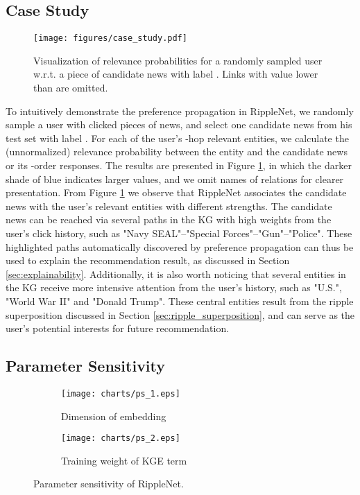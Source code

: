 \documentclass[sigconf]{acmart}
\begin{document}
		
	\subsection{Case Study}
		\begin{figure}[t]
			\centering
  			\texttt{[image: figures/case\_study.pdf]}
  			\caption{Visualization of relevance probabilities for a randomly sampled user w.r.t. a piece of candidate news with label . Links with value lower than  are omitted.}
  			\label{fig:cs}
		\end{figure}
		
		To intuitively demonstrate the preference propagation in RippleNet, we randomly sample a user with  clicked pieces of news, and select one candidate news from his test set with label .
		For each of the user's -hop relevant entities, we calculate the (unnormalized) relevance probability between the entity and the candidate news or its -order responses.
		The results are presented in Figure \ref{fig:cs}, in which the darker shade of blue indicates larger values, and we omit names of relations for clearer presentation.
		From Figure \ref{fig:cs} we observe that RippleNet associates the candidate news with the user's relevant entities with different strengths.
		The candidate news can be reached via several paths in the KG with high weights from the user's click history, such as "Navy SEAL"--"Special Forces"--"Gun"--"Police".
		These highlighted paths automatically discovered by preference propagation can thus be used to explain the recommendation result, as discussed in Section \ref{sec:explainability}.
		Additionally, it is also worth noticing that several entities in the KG receive more intensive attention from the user's history, such as "U.S.", "World War II" and "Donald Trump".
		These central entities result from the ripple superposition discussed in Section \ref{sec:ripple_superposition}, and can serve as the user's potential interests for future recommendation.

		
	\subsection{Parameter Sensitivity}
		\begin{figure}[t]
			\centering
            \begin{subfigure}[b]{0.23\textwidth}
                \texttt{[image: charts/ps\_1.eps]}
                \caption{Dimension of embedding}
                \label{fig:ps_1}
            \end{subfigure}
            \hfill
            \begin{subfigure}[b]{0.23\textwidth}
                \texttt{[image: charts/ps\_2.eps]}
                \caption{Training weight of KGE term}
                \label{fig:ps_2}
            \end{subfigure}
            \caption{Parameter sensitivity of RippleNet.}
            \label{fig:ps}
        \end{figure}
        
\end{document}

